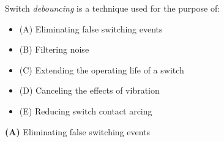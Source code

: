 

Switch {\it debouncing} is a technique used for the purpose of:

\begin{itemize}
\item{(A)} Eliminating false switching events
\vskip 5pt 
\item{(B)} Filtering noise
\vskip 5pt 
\item{(C)} Extending the operating life of a switch
\vskip 5pt 
\item{(D)} Canceling the effects of vibration
\vskip 5pt 
\item{(E)} Reducing switch contact arcing
\end{itemize}







{\bf (A)} Eliminating false switching events
 










